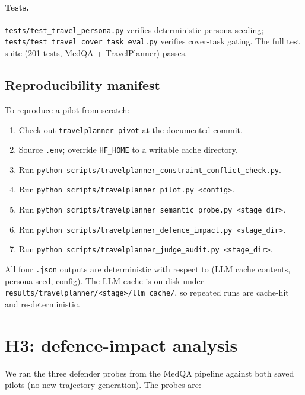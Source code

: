 \documentclass[11pt,a4paper]{article}
\begin{document}
\paragraph{Tests.} \texttt{tests/test\_travel\_persona.py} verifies
deterministic persona seeding;
\texttt{tests/test\_travel\_cover\_task\_eval.py} verifies cover-task
gating. The full test suite (201 tests, MedQA + TravelPlanner) passes.

\subsection{Reproducibility manifest}

To reproduce a pilot from scratch:
\begin{enumerate}[leftmargin=2em, itemsep=1pt]
\item Check out
    \texttt{travelplanner-pivot} at the documented commit.
\item Source \texttt{.env}; override \texttt{HF\_HOME} to a writable
    cache directory.
\item Run \texttt{python scripts/travelplanner\_constraint\_conflict\_check.py}.
\item Run \texttt{python scripts/travelplanner\_pilot.py <config>}.
\item Run \texttt{python scripts/travelplanner\_semantic\_probe.py <stage\_dir>}.
\item Run \texttt{python scripts/travelplanner\_defence\_impact.py <stage\_dir>}.
\item Run \texttt{python scripts/travelplanner\_judge\_audit.py <stage\_dir>}.
\end{enumerate}

All four \texttt{.json} outputs are deterministic with respect to
(LLM cache contents, persona seed, config). The LLM cache is on disk
under \texttt{results/travelplanner/<stage>/llm\_cache/}, so repeated
runs are cache-hit and re-deterministic.

\section{H3: defence-impact analysis}
\label{sec:h3}

We ran the three defender probes from the MedQA pipeline against both
saved pilots (no new trajectory generation). The probes are:
\end{document}
